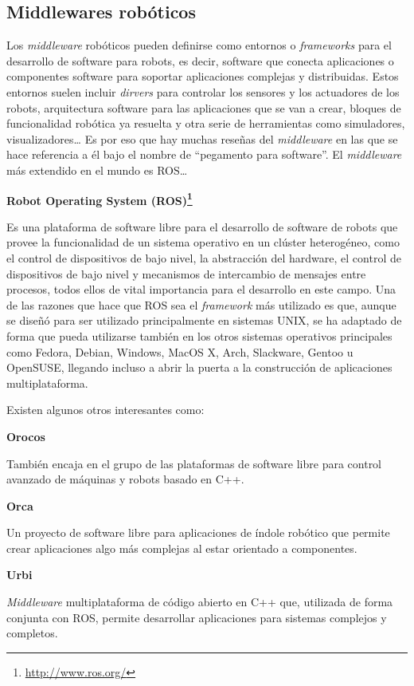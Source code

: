 \subsection{Middlewares robóticos}
Los \textit{middleware} robóticos pueden definirse como entornos o \textit{frameworks} para el desarrollo de software para robots, es decir, software que conecta aplicaciones o componentes software para soportar aplicaciones complejas y distribuidas. Estos entornos suelen incluir \textit{dirvers} para controlar los sensores y los actuadores de los robots, arquitectura software para las aplicaciones que se van a crear, bloques de funcionalidad robótica ya resuelta y otra serie de herramientas como simuladores, visualizadores… Es por eso que hay muchas reseñas del \textit{middleware} en las que se hace referencia a él bajo el nombre de “pegamento para software”. El \textit{middleware} más extendido en el mundo es ROS…

	\textbf{Robot Operating System (ROS)\footnote{\url{http://www.ros.org/}}}
	
Es una plataforma de software libre para el desarrollo de software de robots que provee la funcionalidad de un sistema operativo en un clúster heterogéneo, como el control de dispositivos de bajo nivel, la abstracción del hardware, el control de dispositivos de bajo nivel y mecanismos de intercambio de mensajes entre procesos, todos ellos de vital importancia para el desarrollo en este campo. Una de las razones que hace que ROS sea el \textit{framework} más utilizado es que, aunque se diseñó para ser utilizado principalmente en sistemas UNIX, se ha adaptado de forma que pueda utilizarse también en los otros sistemas operativos principales como Fedora, Debian,  Windows, MacOS X, Arch, Slackware, Gentoo u OpenSUSE, llegando incluso a abrir la puerta a la construcción de aplicaciones multiplataforma.

Existen algunos otros interesantes como: 

	\textbf{Orocos}
	
También encaja en el grupo de las plataformas de software libre para control avanzado de máquinas y robots basado en C++.
 
	\textbf{Orca}
	
Un proyecto de software libre para aplicaciones de índole robótico que permite crear aplicaciones algo más complejas al estar orientado a componentes.

	\textbf{Urbi}
	
\textit{Middleware} multiplataforma de código abierto en C++ que, utilizada de forma conjunta con ROS, permite desarrollar aplicaciones para sistemas complejos y completos.

